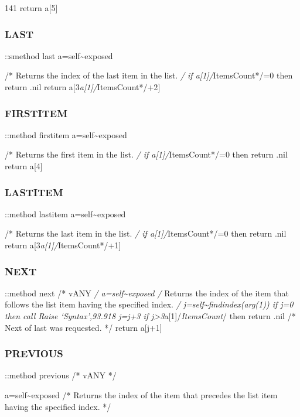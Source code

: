 141 return a{[}5{]}

\subsubsection{LAST}\label{last}

::smethod last a=self\textasciitilde exposed

/* Returns the index of the last item in the list. \emph{/ if
a{[}1{]}/}ItemsCount*/=0 then return .nil return
a{[}3\emph{a{[}1{]}/}ItemsCount*/+2{]}

\subsubsection{FIRSTITEM}\label{firstitem}

::method firstitem a=self\textasciitilde exposed

/* Returns the first item in the list. \emph{/ if
a{[}1{]}/}ItemsCount*/=0 then return .nil return a{[}4{]}

\subsubsection{LASTITEM}\label{lastitem}

::method lastitem a=self\textasciitilde exposed

/* Returns the last item in the list. \emph{/ if
a{[}1{]}/}ItemsCount*/=0 then return .nil return
a{[}3\emph{a{[}1{]}/}ItemsCount*/+1{]}

\subsubsection{NEXT}\label{next}

::method next /* vANY \emph{/ a=self\textasciitilde exposed /} Returns
the index of the item that follows the list item having the specified
index. \emph{/ j=self\textasciitilde findindex(arg(1)) if j=0 then call
Raise `Syntax',93.918 j=j+3 if
j\textgreater3}a{[}1{]}/\emph{ItemsCount}/ then return .nil /* Next of
last was requested. */ return a{[}j+1{]}

\subsubsection{PREVIOUS}\label{previous}

::method previous /* vANY */

a=self\textasciitilde exposed /* Returns the index of the item that
precedes the list item having the specified index. */

